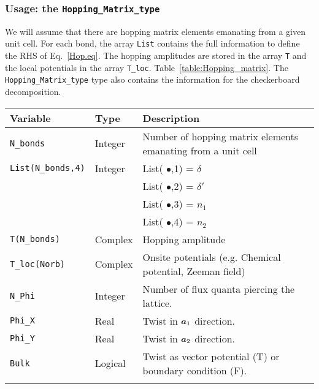 \subsubsection{Usage: the  \texttt{Hopping\_Matrix\_type} }


We will assume that there are     hopping   matrix  elements  emanating  from  a  given unit  cell. For  each bond,  the array 
\texttt{List}   contains the full  information to define the  RHS of Eq.~\eqref{Hop.eq}.    The hopping amplitudes are  stored in the  array  \texttt{T}  and the local potentials in the  array \texttt{T\_loc}.  Table~\ref{table:Hopping_matrix}.    The  \texttt{Hopping\_Matrix\_type}   type    also contains the information for the  checkerboard   decomposition.

\begin{table}[h]
    \begin{tabular}{@{} l l l @{}}\toprule
    Variable & Type & Description \\\midrule
     \texttt{N\_bonds}  &  Integer  &      Number of  hopping  matrix elements emanating from a unit cell   \\
     \texttt{List(N\_bonds,4)}    & Integer &  List( $\bullet$,1) =   $\delta$ \\
                                              &              &  List( $\bullet$,2) =   $\delta'$ \\
                                              &              &  List( $\bullet$,3) =   $n_1$     \\
                                              &              &  List( $\bullet$,4) =   $n_2$     \\ 
     \texttt{T(N\_bonds)}          & Complex &   Hopping amplitude   \\
     \texttt{T\_loc(Norb)}           & Complex &    Onsite  potentials (e.g.  Chemical potential, Zeeman field)   \\
     \texttt{N\_Phi}                    & Integer     &  Number of  flux quanta piercing the lattice.   \\
     \texttt{Phi\_X}                    &  Real        &   Twist in $\boldsymbol{a}_1$  direction.   \\
     \texttt{Phi\_Y}                    &  Real        &   Twist in $\boldsymbol{a}_2$  direction.   \\
     \texttt{Bulk}                        &   Logical   &   Twist as vector potential (T) or  boundary condition (F).
        \\  \\

\end{tabular}
\end{table}
